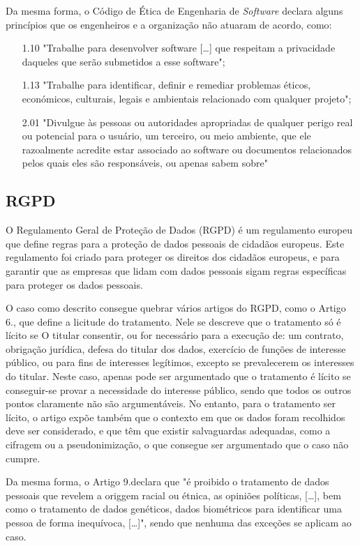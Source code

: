\documentclass[12pt]{../diazessay}
\begin{document}
Da mesma forma, o Código de Ética de Engenharia de \textit{Software} \parencite{code} declara alguns princípios que os engenheiros e a organização não atuaram de acordo, como:
\begin{itemize}
  \item [1.10] "Trabalhe para desenvolver software [\dots] que respeitam a privacidade daqueles que serão submetidos a esse software";
  \item [1.13] "Trabalhe para identificar, definir e remediar problemas éticos, económicos, culturais, legais e ambientais relacionado com qualquer projeto";
  \item [2.01] "Divulgue às pessoas ou autoridades apropriadas de qualquer perigo real ou potencial para o usuário, um terceiro, ou meio ambiente, que ele razoalmente acredite estar associado ao software ou documentos relacionados pelos quais eles são responsáveis, ou apenas sabem sobre"
\end{itemize}

\subsection*{RGPD}
O Regulamento Geral de Proteção de Dados (RGPD) é um regulamento europeu que define regras para a proteção de dados pessoais de cidadãos europeus. Este regulamento foi criado para proteger os direitos dos cidadãos europeus, e para garantir que as empresas que lidam com dados pessoais sigam regras específicas para proteger os dados pessoais.


O caso como descrito consegue quebrar vários artigos do RGPD, como o Artigo 6.\textdegree, que define a licitude do tratamento. Nele se descreve que o tratamento só é lícito se O titular consentir, ou for necessário para a execução de: um contrato, obrigação jurídica, defesa do titular dos dados, exercício de funções de interesse público, ou para fins de interesses legítimos, excepto se prevalecerem os interesses do titular. Neste caso, apenas pode ser argumentado que o tratamento é lícito se conseguir-se provar a necessidade do interesse público, sendo que todos os outros pontos claramente não são argumentáveis. No entanto, para o tratamento ser lícito, o artigo expõe também que o contexto em que os dados foram recolhidos deve ser considerado, e que têm que existir salvaguardas adequadas, como a cifragem ou a pseudonimização, o que consegue ser argumentado que o caso não cumpre. 


Da mesma forma, o Artigo 9.\textdegree declara que "é proibido o tratamento de dados pessoais que revelem a origgem racial ou étnica, as opiniões políticas, [\dots], bem como o tratamento de dados genéticos, dados biométricos para identificar uma pessoa de forma inequívoca, [\dots]", sendo que nenhuma das exceções se aplicam ao caso.
\end{document}
